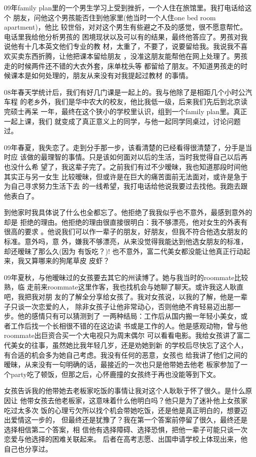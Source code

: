 \documentclass[12pt]{book}
\begin{document}
09年family plan里的一个男生学习上受到挫折，一个人住在旅馆里。我打电话给这个
朋友，问他这个男孩能否住到他家里(他当时一个人住one bed room apartment)，他比
较世俗，对对这个男生有些避之不及的感觉，很不愿意帮忙。电话里我给他分析男孩的
困境现状以及可以有的结果，最终他答应了。男孩对我说他有十几本英文他们专业的教
材，太重了，不要了，说要留给我。我说我不喜欢买卖东西折腾，让他把课本留给朋友
，没准这朋友能帮他在网上处理了。男孩走的时候两件还不错的大衣外套，床单枕头等
都留给了朋友。不知道男孩走的时候课本是如何处理的，朋友从来没有对我提起过教材
的事情。

08年春天学统计后，我们有好几门课是一起上的。我与他除了是相距几个小时公汽车程
的老乡外，我们是华中农大的校友，他比我低一级，后来我们先后到北京读完硕士再呆
一年，最终在这个狭小的学校里认识，组到一个family plan里。真正一起上课，我们
就变成了真正意义上的同学，与他一起同学同桌过，讨论问题过。

09年春夏，我失恋了。走到分手那一步，该看清楚的已经看得很清楚了，分手是当时应
该做的最理智的事情。只是该如何面对以后的生活，当时我觉得自己以后再也没什么希
望了，我这辈子完了。之前我们有过不少暧昧，我也知道那段时间他其实正与另一女生
比较暧昧，但或许是在巨大的痛苦面前无法面对，或许是急于为自己寻求努力生活下去
的一线希望，我打电话给他说我要过去找他。我跑去跟他表白了。

到他家时我具体说了什么也全都忘了。他拒绝了我我似乎也不意外，最感到意外的却是
拒绝的理由。他拒绝的理由很直接很明白：我不够漂亮，他对女生的外表有很高的要求
。他说我们可以作一辈子的朋友，好朋友，但我不符合他选女朋友的标准。意外吗，意
外，嫌我不够漂亮，从来没觉得我能达到他选女朋友的标准，却还暧昧了那么久(因为
有饭吃？)! 也不意外，富二代美女都没能让他真正行动起来，我又算哪来的狗尾草皮
皮虾？

09年夏秋，与他暧昧过的女孩要去其它的州读博了。她与我当时的roommate比较熟，临
走前来roommate这里作客，我也找机会与她聊了聊天。或许我这人耿直吧，我把我对朋
友的了解全分享给女孩了。我对女孩说，以我的了解，他是一辈子只谈一次恋爱的人，
除非女孩子让他非常动心，否则他绝不肯轻易迈出那一步。他的感情只有可以猜测到了
一两种结局：工作后从国内搬一年轻小美女，或者工作后找一个长相很不错的在这边读
书或是工作的人。他是感观动物，曾与他roommate出巨资合买一个大电视只为周末偶尔
可以看看电影。我给女孩讲了富二代美女的往事，虽然她比我年轻几岁，还是劝她到新
的学校后尽快忘了这个人，有合适的机会多为她自己考虑。我没有任何的恶意，女孩也
给我讲了他们之间的暧昧，从来没有一句明确的话，最接近的一次也只是他带她去他老
板家参加了一个party吃了顿饭，但那之后，心怀鹿撞的女孩终于再也没能等到下文。

女孩告诉我的他带她去老板家吃饭的事情让我对这个人耿耿于怀了很久。是什么原因让
他带女孩去他老板家，这意味着什么他明白吗？他只是为了迷补他上女孩家吃过太多次
饭的心理亏欠所以找个机会带她吃饭，还是他是真正明白的，想要迈出爱情这一步的，
但最终还是犹豫了？我在第一个答案前停留了很久，最终还是选择相信第二个答案，相
信他有选择障碍、选择恐惧，把他一辈子可能只谈一次恋爱与他选择的困难关联起来。
后者在高考志愿、出国申请学校上体现出来，他自己也分享过。
\end{document}
